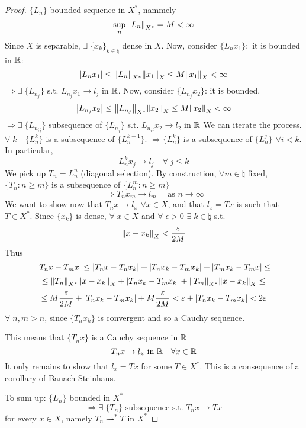 \begin{proof}
    \(\{L_n\}\) bounded sequence in \(X^*\), nammely
    \[
        \sup_{n} \norm{L_n}_{X^*} = M < \infty
    \]
    Since \(X\) is separable, \(\exists \; \{x_k\}_{k \in \natural}\) dense in \(X\). 
    Now, consider \(\{L_n x_1\}:\) it is bounded in \(\mathbb{R}\):
    \[
        \abs{L_n x_1} \leq \norm{L_n}_{X^*} \norm{x_1}_X \leq M \norm{x_1}_X < \infty
    \]
    \(\Rightarrow \exists \; \{L_{n_j}\}\) s.t. \(L_{n_j} x_1 \to l_j\) in \(\mathbb{R}\). Now, consider \(\{L_{n_j} x_2\}\): it is bounded,
    \[
        \abs{L_{n_j}x_2} \leq \norm{L_{n_j}}_{X^*} \norm{x_2}_X \leq M \norm{x_2}_X < \infty
    \]
    \(\Rightarrow \exists\; \{L_{n_{ij}}\}\) subsequence of \(\{L_{n_j}\}\) s.t. \( L_{n_{ij}} x_2 \to l_2\) in \(\mathbb{R}\)
    We can iterate the process. \(\forall \; k \quad \{L_n^k\}\) is a subsequence of \(\{L_n^{k-1}\}\). \(\Rightarrow \{L_n^k\}\) is a subsequence of \(\{L_n^j\}\) \(\forall i < k\). In particular, 
    \[
        L_n^k x_j \to l_j \quad \forall \; j \leq k
    \]
    We pick up \(T_n = L_n^n\) (diagonal selection). By construction, \(\forall m \in \natural\) fixed, \(\{T_n: n \geq m\}\) is a subsequence of \(\{L_n^m: n \geq m\}\) 
    \[
        \Rightarrow T_n x_m \to l_m \quad \text{ as } n \to \infty
    \]
    We want to show now that \(T_n x \to l_x\) \(\forall x \in X\), and that \(l_x = Tx\) is such that \(T \in X^*\). Since \(\{x_k\}\) is dense, \(\forall \; x \in X\) and \( \forall\; \epsilon >0\) \(\exists\; k \in \natural \) s.t. 
    \[
        \norm{x-x_k}_X < \frac{\varepsilon}{2M}
    \]
    Thus
    \[
        \abs{T_n x - T_m x} \leq \abs{T_n x - T_n x_k} + \abs{T_n x_k - T_m x_k} + \abs{T_m x_k - T_m x} \leq 
    \]
    \[
    \leq \norm{T_n}_{X^*} \norm{x -x_k}_X + \abs{T_n x_k - T_m x_k} + \norm{T_m}_{X^*} \norm{x -x_k}_X \leq
    \]
    \[
        \leq M \frac{\varepsilon}{2M} + \abs{T_n x_k - T_m x_k} + M \frac{\varepsilon}{2M} 
        < \varepsilon + \abs{T_n x_k - T_m x_k} < 2 \varepsilon
    \]
    \(\forall \; n, m > \overline{n}\), since \(\{T_n x_k\}\) is convergent and so a Cauchy sequence.

    This means that \(\{T_n x\}\) is a Cauchy sequence in \(\mathbb{R}\)
    \[
        T_n x \to l_x \text{ in } \mathbb{R} \quad \forall x \in \mathbb{R}
    \]
    It only remains to show that \(l_x = Tx\) for some \(T \in X^*\). This is a consequence of a corollary of Banach Steinhaus.

    To sum up: \(\{L_n\}\) bounded in \(X^*\)
    \[
        \Rightarrow \exists \; \{T_n\} \text{ subsequence s.t. } T_n x \to Tx
    \]
    for every \(x \in X\), namely \(T_n\rightharpoonup^* T\) in \(X^*\)
\end{proof}

